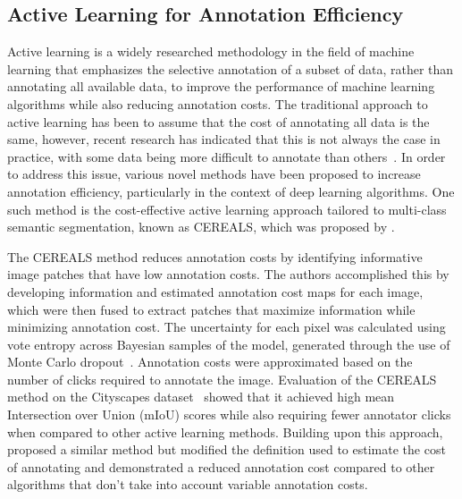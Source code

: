 \subsection{Active Learning for Annotation Efficiency}
\label{subsec:active_annotation_efficiency}
Active learning is a widely researched methodology in the field of machine learning that emphasizes the selective annotation of a subset of data, rather than annotating all available data, to improve the performance of machine learning algorithms while also reducing annotation costs. The traditional approach to active learning has been to assume that the cost of annotating all data is the same, however, recent research has indicated that this is not always the case in practice, with some data being more difficult to annotate than others~\citep{settles2008active2}. In order to address this issue, various novel methods have been proposed to increase annotation efficiency, particularly in the context of deep learning algorithms. One such method is the cost-effective active learning approach tailored to multi-class semantic segmentation, known as CEREALS, which was proposed by \cite{mackowiak2018cereals}.

The CEREALS method reduces annotation costs by identifying informative image patches that have low annotation costs. The authors accomplished this by developing information and estimated annotation cost maps for each image, which were then fused to extract patches that maximize information while minimizing annotation cost. The uncertainty for each pixel was calculated using vote entropy across Bayesian samples of the model, generated through the use of Monte Carlo dropout~\citep{gal2016dropout}. Annotation costs were approximated based on the number of clicks required to annotate the image. Evaluation of the CEREALS method on the Cityscapes dataset~\citep{cordts2016cityscapes} showed that it achieved high mean Intersection over Union (mIoU) scores while also requiring fewer annotator clicks when compared to other active learning methods. Building upon this approach, \cite{colling2020metabox} proposed a similar method but modified the definition used to estimate the cost of annotating and demonstrated a reduced annotation cost compared to other algorithms that don’t take into account variable annotation costs.



